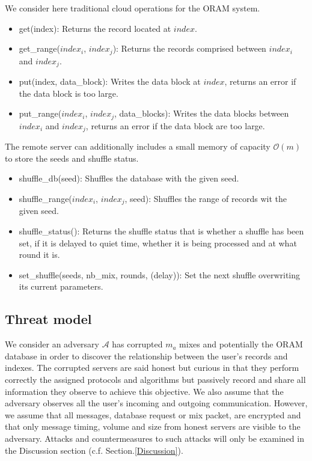 \documentclass[english,oneside,twocolumn]{article}
\begin{document}
We consider here traditional cloud operations for the ORAM system.
\begin{itemize}
 \item get(index): Returns the record located at $index$.
 \item get\_range($index_i$, $index_j$): Returns the records comprised between $index_i$ and $index_j$.
 \item put(index, data\_block):  Writes the data block at $index$, returns an error if the data block is too large.
 \item put\_range($index_i$, $index_j$, data\_blocks): Writes the data blocks between $index_i$ and $index_j$, returns an error if the data block are too large.
\end{itemize}

The remote server can additionally includes a small memory of capacity $\mathcal{O}(m)$ to store the seeds and shuffle status.
\begin{itemize}
 \item shuffle\_db(seed): Shuffles the database with the given seed.
 \item shuffle\_range($index_i$, $index_j$, seed): Shuffles the range of records wit the given seed.
 \item shuffle\_status(): Returns the shuffle status that is whether a shuffle has been set, if it is delayed to quiet time, whether it is being processed and at what round it is.
 \item set\_shuffle(seeds, nb\_mix, rounds, (delay)): Set the next shuffle overwriting its current parameters.
\end{itemize}


\subsection{Threat model}
We consider an adversary $\mathcal{A}$ has corrupted $m_{a}$ mixes and potentially the ORAM database in order to discover the relationship between the user's records and indexes.
The corrupted servers are said honest but curious in that they perform correctly the assigned protocols and algorithms but passively record and share all information they observe to achieve this objective.
We also assume that the adversary observes all the user's incoming and outgoing communication. However, we assume that all messages, database request or mix packet, are encrypted and that only message timing, volume and size from honest servers are visible to the adversary.
Attacks and countermeasures to such attacks will only be examined in the Discussion section (c.f. Section.\ref{Discussion}).
\end{document}
